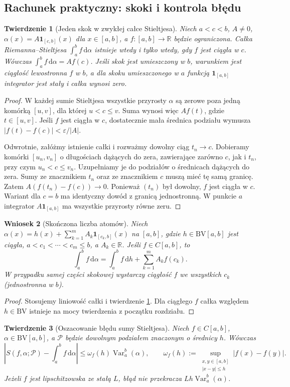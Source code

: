\documentclass[11pt,a4paper]{article}
\numberwithin{equation}{section}
\theoremstyle{plain}
\newtheorem{twierdzenie}{Twierdzenie}[section]
\newtheorem{wniosek}[twierdzenie]{Wniosek}
\theoremstyle{definition}
\theoremstyle{remark}
\newcommand{\R}{\mathbb R}
\newcommand{\ind}[1]{\mathbf 1_{#1}}
\newcommand{\Var}{\operatorname{Var}}
\newcommand{\BV}{\mathrm{BV}}
\begin{document}
\subsection*{Rachunek praktyczny: skoki i kontrola błędu}
\begin{twierdzenie}[Jeden skok w zwykłej całce Stieltjesa]\label{tw:rs-jeden-skok}
Niech $a<c<b$, $A\ne0$, $\alpha(x)=A\ind{[c,b]}(x)$ dla $x\in[a,b]$, a $f:[a,b]\to\R$ będzie ograniczona. Całka Riemanna--Stieltjesa $\int_a^b f\,\mathrm d\alpha$ istnieje wtedy i tylko wtedy, gdy $f$ jest ciągła w $c$. Wówczas $\int_a^b f\,\mathrm d\alpha=Af(c)$. Jeśli skok jest umieszczony w $b$, warunkiem jest ciągłość lewostronna $f$ w $b$, a dla skoku umieszczonego w $a$ funkcją $\ind{[a,b]}$ integrator jest stały i całka wynosi zero.
\end{twierdzenie}
\begin{proof}
W każdej sumie Stieltjesa wszystkie przyrosty $\alpha$ są zerowe poza jedną komórką $[u,v]$, dla której $u<c\le v$. Suma wynosi więc $Af(t)$, gdzie $t\in[u,v]$. Jeśli $f$ jest ciągła w $c$, dostatecznie mała średnica podziału wymusza $|f(t)-f(c)|<\varepsilon/|A|$.

Odwrotnie, załóżmy istnienie całki i rozważmy dowolny ciąg $t_n\to c$. Dobieramy komórki $[u_n,v_n]$ o długościach dążących do zera, zawierające zarówno $c$, jak i $t_n$, przy czym $u_n<c\le v_n$. Uzupełniamy je do podziałów o średnicach dążących do zera. Sumy ze znacznikiem $t_n$ oraz ze znacznikiem $c$ muszą mieć tę samą granicę. Zatem $A(f(t_n)-f(c))\to0$. Ponieważ $(t_n)$ był dowolny, $f$ jest ciągła w $c$. Wariant dla $c=b$ ma identyczny dowód z granicą jednostronną. W punkcie $a$ integrator $A\ind{[a,b]}$ ma wszystkie przyrosty równe zeru.
\end{proof}
\begin{wniosek}[Skończona liczba atomów]\label{wn:rs-suma-skokow}
Niech $\alpha(x)=h(x)+\sum_{k=1}^m A_k\ind{[c_k,b]}(x)$ na $[a,b]$, gdzie $h\in\BV[a,b]$ jest ciągła, $a<c_1<\cdots<c_m\le b$, a $A_k\in\R$. Jeśli $f\in C[a,b]$, to
\[
\int_a^b f\,\mathrm d\alpha=\int_a^b f\,\mathrm dh+\sum_{k=1}^m A_kf(c_k).
\]
W przypadku samej części skokowej wystarczy ciągłość $f$ we wszystkich $c_k$ (jednostronna w $b$).
\end{wniosek}
\begin{proof}
Stosujemy liniowość całki i twierdzenie \ref{tw:rs-jeden-skok}. Dla ciągłego $f$ całka względem $h\in\BV$ istnieje na mocy twierdzenia z początku rozdziału.
\end{proof}
\begin{twierdzenie}[Oszacowanie błędu sumy Stieltjesa]\label{tw:rs-blad-kwadratury}
Niech $f\in C[a,b]$, $\alpha\in\BV[a,b]$, a $\mathcal P$ będzie dowolnym podziałem znaczonym o średnicy $h$. Wówczas
\[
\left|S(f,\alpha;\mathcal P)-\int_a^b f\,\mathrm d\alpha\right|
\le \omega_f(h)\Var_a^b(\alpha),
\qquad
\omega_f(h):=\sup_{\substack{x,y\in[a,b]\\|x-y|\le h}}|f(x)-f(y)|.
\]
Jeżeli $f$ jest lipschitzowska ze stałą $L$, błąd nie przekracza $Lh\Var_a^b(\alpha)$.
\end{twierdzenie}
\end{document}
